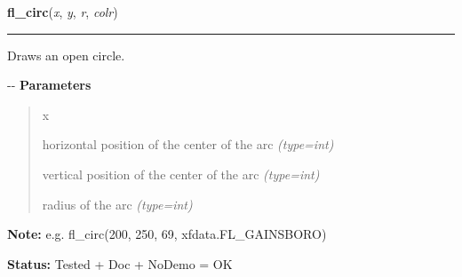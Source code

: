 \hspace{.8\funcindent}\begin{boxedminipage}{\funcwidth}

    \raggedright \textbf{fl\_circ}(\textit{x}, \textit{y}, \textit{r}, \textit{colr})

    \vspace{-1.5ex}

    \rule{\textwidth}{0.5\fboxrule}
\setlength{\parskip}{2ex}

Draws an open circle.

-{}-
\setlength{\parskip}{1ex}
      \textbf{Parameters}
      \vspace{-1ex}

      \begin{quote}
        \begin{Ventry}{x}

          \item[x]


horizontal position of the center of the arc
            {\it (type=int)}

          \item[y]


vertical position of the center of the arc
            {\it (type=int)}

          \item[r]


radius of the arc
            {\it (type=int)}

        \end{Ventry}

      \end{quote}

\textbf{Note:} 
e.g. fl\_circ(200, 250, 69, xfdata.FL\_GAINSBORO)


\textbf{Status:} 
Tested + Doc + NoDemo = OK


    \end{boxedminipage}

    \label{xformslib:flxbasic:fl_pieslice}

    \vspace{0.5ex}

